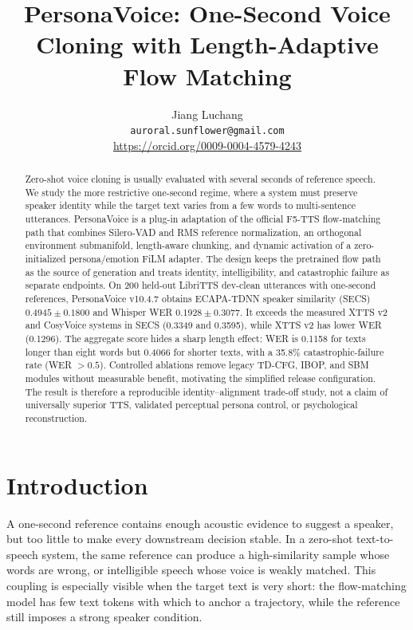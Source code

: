 \documentclass[10pt]{article}
\title{PersonaVoice: One-Second Voice Cloning with Length-Adaptive Flow Matching}
\author{\name Jiang Luchang \\
\addr \texttt{auroral.sunflower@gmail.com} \\
\url{https://orcid.org/0009-0004-4579-4243}}
\begin{document}
\maketitle

\begin{abstract}
Zero-shot voice cloning is usually evaluated with several seconds of reference
speech. We study the more restrictive one-second regime, where a system must
preserve speaker identity while the target text varies from a few words to
multi-sentence utterances. PersonaVoice is a plug-in adaptation of the official
F5-TTS flow-matching path that combines Silero-VAD and RMS reference
normalization, an orthogonal environment submanifold, length-aware chunking,
and dynamic activation of a zero-initialized persona/emotion FiLM adapter. The
design keeps the pretrained flow path as the source of generation and treats
identity, intelligibility, and catastrophic failure as separate endpoints.
On 200 held-out LibriTTS dev-clean utterances with one-second references,
PersonaVoice v10.4.7 obtains ECAPA-TDNN speaker similarity (SECS)
$0.4945\pm0.1800$ and Whisper WER $0.1928\pm0.3077$. It exceeds the measured
XTTS v2 and CosyVoice systems in SECS (0.3349 and 0.3595), while XTTS v2 has
lower WER (0.1296). The aggregate score hides a sharp length effect: WER is
0.1158 for texts longer than eight words but 0.4066 for shorter texts, with a
35.8\% catastrophic-failure rate (WER $>0.5$). Controlled ablations remove
legacy TD-CFG, IBOP, and SBM modules without measurable benefit, motivating the
simplified release configuration. The result is therefore a reproducible
identity--alignment trade-off study, not a claim of universally superior TTS,
validated perceptual persona control, or psychological reconstruction.
\end{abstract}

\section{Introduction}

A one-second reference contains enough acoustic evidence to suggest a speaker,
but too little to make every downstream decision stable. In a zero-shot
text-to-speech system, the same reference can produce a high-similarity sample
whose words are wrong, or intelligible speech whose voice is weakly matched.
This coupling is especially visible when the target text is very short: the
flow-matching model has few text tokens with which to anchor a trajectory, while
the reference still imposes a strong speaker condition.
\end{document}
